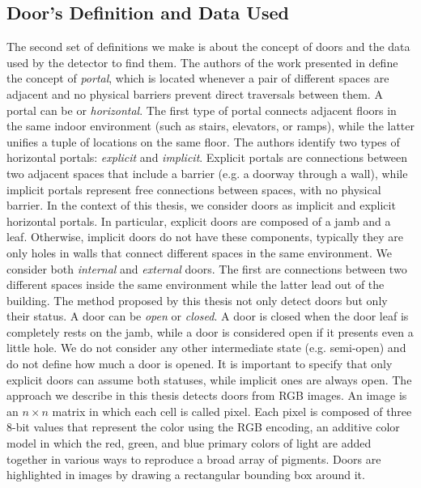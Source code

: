 \subsection{Door's Definition and Data Used} 

The second set of definitions we make is about the concept of doors and the data used by the detector to find them. The authors of the work presented in \cite{topologyurban} define the concept of \textit{portal}, which is located whenever a pair of different spaces are adjacent and no physical barriers prevent direct traversals between them.  A portal can be  or \textit{horizontal}. The first type of portal connects adjacent floors in the same indoor environment (such as stairs, elevators, or ramps), while the latter unifies a tuple of locations on the same floor. The authors identify two types of horizontal portals: \textit{explicit} and \textit{implicit}. Explicit portals are connections between two adjacent spaces that include a barrier (e.g. a doorway through a wall), while implicit portals represent free connections between spaces, with no physical barrier. In the context of this thesis, we consider doors as implicit and explicit horizontal portals. In particular, explicit doors are composed of a jamb and a leaf. Otherwise, implicit doors do not have these components, typically they are only holes in walls that connect different spaces in the same environment. We consider both \textit{internal} and \textit{external} doors. The first are connections between two different spaces inside the same environment while the latter lead out of the building. The method proposed by this thesis not only detect doors but only their status. A door can be \textit{open} or \textit{closed}. A door is closed when the door leaf is completely rests on the jamb, while a door is considered open if it presents even a little hole. We do not consider any other intermediate state (e.g. semi-open) and do not define how much a door is opened. It is important to specify that only explicit doors can assume both statuses, while implicit ones are always open. The approach we describe in this thesis detects doors from RGB images. An image is an $n \times n$ matrix in which each cell is called pixel. Each pixel is composed of three 8-bit values that represent the color using the RGB encoding, an additive color model in which the red, green, and blue primary colors of light are added together in various ways to reproduce a broad array of pigments. Doors are highlighted in images by drawing a rectangular bounding box around it.

